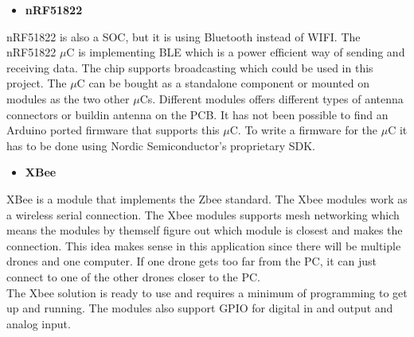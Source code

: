 \begin{itemize}
	\item \textbf{nRF51822}
\end{itemize}
nRF51822 is also a SOC, but it is using Bluetooth instead of WIFI. The nRF51822 $\mu$C is implementing BLE which is a power efficient way of sending and receiving data. The chip supports broadcasting which could be used in this project. The $\mu$C can be bought as a standalone component or mounted on modules as the two other $\mu$Cs. Different modules offers different types of antenna connectors or buildin antenna on the PCB. It has not been possible to find an Arduino ported firmware that supports this $\mu$C. To write a firmware for the $\mu$C it has to be done using Nordic Semiconductor's proprietary SDK. 


\begin{itemize}
	\item \textbf{XBee}
\end{itemize}
XBee is a module that implements the Zbee standard. The Xbee modules work as a wireless serial connection. The Xbee modules supports mesh networking which means the modules by themself figure out which module is closest and makes the connection. This idea makes sense in this application since there will be multiple drones and one computer. If one drone gets too far from the PC, it can just connect to one of the other drones closer to the PC.\\
The Xbee solution is ready to use and requires a minimum of programming to get up and running. The modules also support GPIO for digital in and output and analog input.


